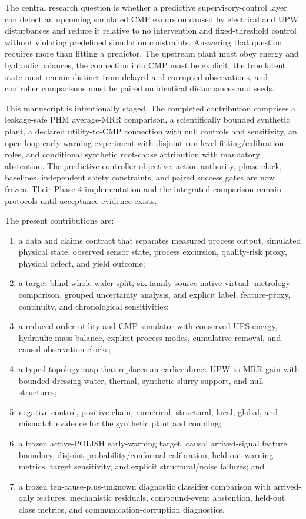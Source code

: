 \documentclass[10pt,twocolumn]{article}
\begin{document}
The central research question is whether a predictive supervisory-control
layer can detect an upcoming simulated CMP excursion caused by electrical and
UPW disturbances and reduce it relative to no intervention and fixed-threshold
control without violating predefined simulation constraints. Answering that
question requires more than fitting a predictor. The upstream plant must obey
energy and hydraulic balances, the connection into CMP must be explicit, the
true latent state must remain distinct from delayed and corrupted observations,
and controller comparisons must be paired on identical disturbances and seeds.

This manuscript is intentionally staged. The completed contribution comprises
a leakage-safe PHM average-MRR comparison, a scientifically bounded synthetic
plant, a declared utility-to-CMP connection with null controls and sensitivity,
an open-loop early-warning experiment with disjoint run-level
fitting/calibration roles, and conditional synthetic root-cause attribution
with mandatory abstention. The predictive-controller objective, action
authority, phase clock, baselines, independent safety constraints, and paired
success gates are now frozen. Their Phase 4 implementation and the integrated
comparison remain protocols until acceptance evidence exists.

The present contributions are:
\begin{enumerate}
  \item a data and claims contract that separates measured process output,
  simulated physical state, observed sensor state, process excursion,
  quality-risk proxy, physical defect, and yield outcome;
  \item a target-blind whole-wafer split, six-family source-native virtual-
  metrology comparison, grouped uncertainty analysis, and explicit label,
  feature-proxy, continuity, and chronological sensitivities;
  \item a reduced-order utility and CMP simulator with conserved UPS energy,
  hydraulic mass balance, explicit process modes, cumulative removal, and
  causal observation clocks;
  \item a typed topology map that replaces an earlier direct UPW-to-MRR gain
  with bounded dressing-water, thermal, synthetic slurry-support, and null
  structures;
  \item negative-control, positive-chain, numerical, structural, local,
  global, and mismatch evidence for the synthetic plant and coupling;
  \item a frozen active-POLISH early-warning target, causal arrived-signal
  feature boundary, disjoint probability/conformal calibration, held-out
  warning metrics, target sensitivity, and explicit structural/noise failures;
  and
  \item a frozen ten-cause-plus-unknown diagnostic classifier comparison with
  arrived-only features, mechanistic residuals, compound-event abstention,
  held-out class metrics, and communication-corruption diagnostics.
\end{enumerate}
\end{document}
